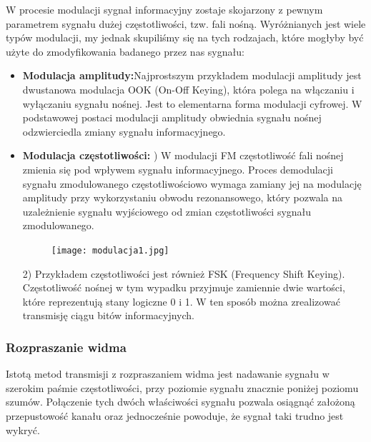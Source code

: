 \documentclass[a4paper,titleauthor]{mwart}
\begin{document}
	W procesie modulacji sygnał informacyjny zostaje skojarzony z pewnym parametrem sygnału dużej częstotliwości, tzw. fali nośną.\newline \newline
	Wyróżnianych jest wiele typów modulacji, my jednak skupiliśmy się na tych rodzajach, które mogłyby być użyte do zmodyfikowania badanego przez nas sygnału: 
	
	\begin{itemize}
		\item \textbf{Modulacja amplitudy:}\newline \newline Najprostszym przykładem modulacji amplitudy jest dwustanowa modulacja OOK (On-Off Keying), która polega na włączaniu i wyłączaniu sygnału nośnej. Jest to elementarna forma modulacji cyfrowej. W podstawowej postaci modulacji amplitudy obwiednia sygnału nośnej odzwierciedla zmiany sygnału informacyjnego. \newline \newline
		\item \textbf{Modulacja częstotliwości:} \newline {})	W modulacji FM częstotliwość fali nośnej zmienia się pod wpływem sygnału informacyjnego. Proces demodulacji sygnału zmodulowanego częstotliwościowo wymaga zamiany jej na modulację amplitudy przy wykorzystaniu obwodu rezonansowego, który pozwala na uzależnienie sygnału wyjściowego od zmian częstotliwości sygnału zmodulowanego. 
		
		\begin{figure}[h]
			\centering
			\texttt{[image: modulacja1.jpg]}
		\end{figure}
		
		2)	Przykładem częstotliwości jest również FSK (Frequency Shift Keying). Częstotliwość nośnej w tym wypadku przyjmuje zamiennie dwie wartości, które reprezentują stany logiczne 0 i 1. W ten sposób można zrealizować transmisję ciągu bitów informacyjnych. 
	\end{itemize}
	
	\subsubsection{Rozpraszanie widma}
	Istotą metod transmisji z rozpraszaniem widma jest nadawanie sygnału w szerokim paśmie częstotliwości, przy poziomie sygnału znacznie poniżej poziomu szumów. \newline \newline
	Połączenie tych dwóch właściwości sygnału pozwala osiągnąć założoną przepustowość kanału oraz jednocześnie powoduje, że sygnał taki trudno jest wykryć. 
	
\end{document}
